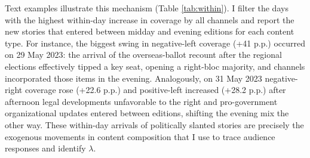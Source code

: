 \documentclass[12pt]{article}
\begin{document}


Text examples illustrate this mechanism (Table \ref{tab:within}). I filter the days with the highest within-day increase in coverage by all channels and report the new stories that entered between midday and evening editions for each content type. For instance, the biggest swing in negative-left coverage (+41 p.p.) occurred on 29 May 2023: the arrival of the overseas-ballot recount after the regional elections effectively tipped a key seat, opening a right-bloc majority, and channels incorporated those items in the evening. Analogously, on 31 May 2023 negative-right coverage rose (+22.6 p.p.) and positive-left increased (+28.2 p.p.) after afternoon legal developments unfavorable to the right and pro-government organizational updates entered between editions, shifting the evening mix the other way. These within-day arrivals of politically slanted stories are precisely the exogenous movements in content composition that I use to trace audience responses and identify $\lambda$.




\end{document}
